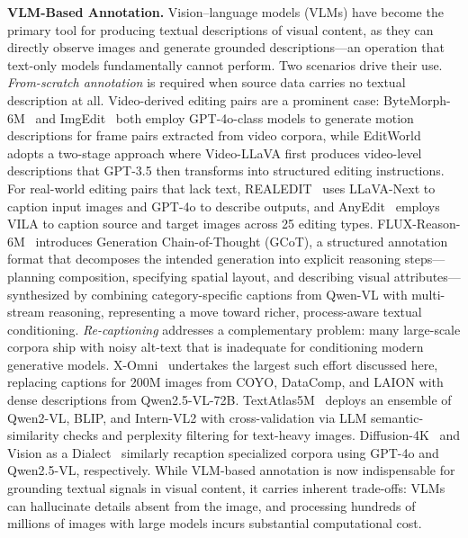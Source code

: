 \textbf{VLM-Based Annotation.}
Vision--language models (VLMs) have become the primary tool for producing textual descriptions of visual content, as they can directly observe images and generate grounded descriptions---an operation that text-only models fundamentally cannot perform. Two scenarios drive their use. \emph{From-scratch annotation} is required when source data carries no textual description at all. Video-derived editing pairs are a prominent case: ByteMorph-6M~\citep{chang2025bytemorph} and ImgEdit~\citep{ye2025imgedit} both employ GPT-4o-class models to generate motion descriptions for frame pairs extracted from video corpora, while EditWorld~\citep{zeng2025editworld} adopts a two-stage approach where Video-LLaVA first produces video-level descriptions that GPT-3.5 then transforms into structured editing instructions. For real-world editing pairs that lack text, REALEDIT~\citep{sushko2025realedit} uses LLaVA-Next to caption input images and GPT-4o to describe outputs, and AnyEdit~\citep{yu2025anyedit} employs VILA to caption source and target images across 25 editing types. FLUX-Reason-6M~\citep{fang2025flux} introduces Generation Chain-of-Thought (GCoT), a structured annotation format that decomposes the intended generation into explicit reasoning steps---planning composition, specifying spatial layout, and describing visual attributes---synthesized by combining category-specific captions from Qwen-VL with multi-stream reasoning, representing a move toward richer, process-aware textual conditioning. \emph{Re-captioning} addresses a complementary problem: many large-scale corpora ship with noisy alt-text that is inadequate for conditioning modern generative models. X-Omni~\citep{geng2025x} undertakes the largest such effort discussed here, replacing captions for 200M images from COYO, DataComp, and LAION with dense descriptions from Qwen2.5-VL-72B. TextAtlas5M~\citep{wang2025textatlas5m} deploys an ensemble of Qwen2-VL, BLIP, and Intern-VL2 with cross-validation via LLM semantic-similarity checks and perplexity filtering for text-heavy images. Diffusion-4K~\citep{zhang2025diffusion} and Vision as a Dialect~\citep{han2025vision} similarly recaption specialized corpora using GPT-4o and Qwen2.5-VL, respectively. While VLM-based annotation is now indispensable for grounding textual signals in visual content, it carries inherent trade-offs: VLMs can hallucinate details absent from the image, and processing hundreds of millions of images with large models incurs substantial computational cost.

